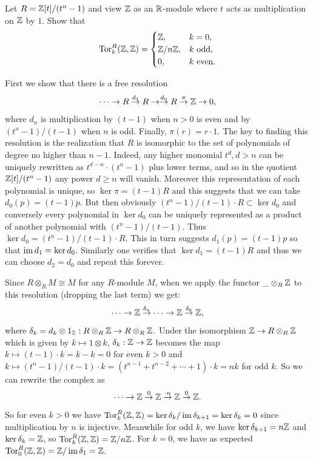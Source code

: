 \begin{example}\label{example Tor with R=Z[t]/(tn-1)}
    Let $R=\mathbb{Z}[t]\slash(t^n-1)$ and view $\mathbb{Z}$ as an $\mathbb{R}$-module where $t$ acts as multiplication on $\mathbb{Z}$ by $1$. Show that
        \[\operatorname{Tor}_k^R(\mathbb{Z},\mathbb{Z})=\begin{cases}
            \mathbb{Z},&k=0,\\
            \mathbb{Z}\slash n\mathbb{Z},&k\text{ odd},\\
            0,& k\text{ even}.
        \end{cases}\]

    First we show that there is a free resolution
    \[\cdots\to R\overset{d_1}{\to}R\to \overset{d_0}{\to}R \overset{\pi}{\to}\mathbb{Z}\to 0,\]
    where $d_n$ is multiplication by $(t-1)$ when $n>0$ is even and by $(t^n-1)/(t-1)$ when $n$ is odd. Finally, $\pi(r)=r\cdot 1$. The key to finding this resolution is the realization that $R$ is isomorphic to the set of polynomials of degree no higher than $n-1$. Indeed, any higher monomial $t^d, d>n$ can be uniquely rewritten as $t^{d-n}\cdot (t^n-1)$ plus lower terms, and so in the quotient $\mathbb{Z}[t]/(t^n-1)$ any power $d\geq n$ will vanish. Moreover this representation of each polynomial is unique, so $\ker\pi =(t-1)R$ and this suggests that we can take $d_0(p)=(t-1)p$. But then obviously $(t^n-1)/(t-1)\cdot R\subset \ker d_0$ and conversely every polynomial in $\ker d_0$ can be uniquely represented as a product of another polynomial with $(t^n-1)/(t-1)$. Thus $\ker d_0=(t^n-1)/(t-1)\cdot R$. This in turn suggests $d_1(p)=(t-1)p$ so that $\operatorname{im} d_1=\ker d_0$. Similarly one verifies that $\ker d_1=(t-1)R$ and thus we can choose $d_2=d_0$ and repeat this forever.

    Since $R\otimes_R M\cong M$ for any $R$-module $M$, when we apply the functor $\_\otimes_R \mathbb{Z}$ to this resolution (dropping the last term) we get:
    \[\cdots\to \mathbb{Z} \overset{\delta_n}{\to}\cdots \to \mathbb{Z}\overset{\delta_0}{\to}\mathbb{Z},\]
    where $\delta_k=d_k\otimes 1_{\mathbb{Z}}: R\otimes_R\mathbb{Z}\to R\otimes_R\mathbb{Z}$. Under the isomorphism $\mathbb{Z}\to R\otimes_R\mathbb{Z}$ which is given by $k\mapsto 1\otimes k$, $\delta_k:\mathbb{Z}\to \mathbb{Z}$  becomes the map $k\mapsto (t-1)\cdot k=k-k=0$ for even $k>0$ and $k\mapsto (t^n-1)/(t-1)\cdot k=(t^{n-1}+t^{n-2}+\cdots +1)\cdot k=nk$ for odd $k$. So we can rewrite the complex as
    \[\cdots\to \mathbb{Z}\overset{0}{\to}\mathbb{Z}\overset{\cdot n}{\to}\mathbb{Z}\overset{0}{\to}\mathbb{Z}.\]
    So for even $k>0$ we have $\operatorname{Tor}_k^R(\mathbb{Z},\mathbb{Z})=\ker\delta_k\slash\operatorname{im}\delta_{k+1}=\ker\delta_k=0$ since multiplication by $n$ is injective. Meanwhile for odd $k$, we have $\ker\delta_{k+1}=n\mathbb{Z}$ and $\ker \delta_k=\mathbb{Z}$, so $\operatorname{Tor}^R_k(\mathbb{Z},\mathbb{Z})=\mathbb{Z}\slash n\mathbb{Z}$. For $k=0$, we have as expected $\operatorname{Tor}_0^R(\mathbb{Z},\mathbb{Z})=\mathbb{Z}\slash \operatorname{im}\delta_1=\mathbb{Z}$.
\end{example}


